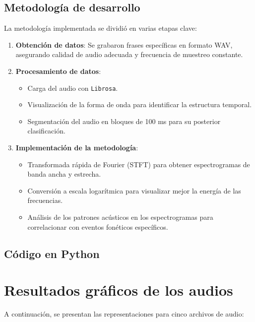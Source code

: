\documentclass{report}
\begin{document}
\subsection{Metodología de desarrollo}
La metodología implementada se dividió en varias etapas clave:

\begin{enumerate}
    \item \textbf{Obtención de datos}: Se grabaron frases específicas en formato WAV, asegurando calidad de audio adecuada y frecuencia de muestreo constante.
    \item \textbf{Procesamiento de datos}: 
    \begin{itemize}
        \item Carga del audio con \texttt{Librosa}.
        \item Visualización de la forma de onda para identificar la estructura temporal.
        \item Segmentación del audio en bloques de 100 ms para su posterior clasificación.
    \end{itemize}
    \item \textbf{Implementación de la metodología}:
    \begin{itemize}
        \item Transformada rápida de Fourier (STFT) para obtener espectrogramas de banda ancha y estrecha.
        \item Conversión a escala logarítmica para visualizar mejor la energía de las frecuencias.
        \item Análisis de los patrones acústicos en los espectrogramas para correlacionar con eventos fonéticos específicos.
    \end{itemize}
    
\end{enumerate}

\newpage
\subsection{Código en Python}

\newpage
\section{Resultados gráficos de los audios}
A continuación, se presentan las representaciones para cinco archivos de audio:
\end{document}
